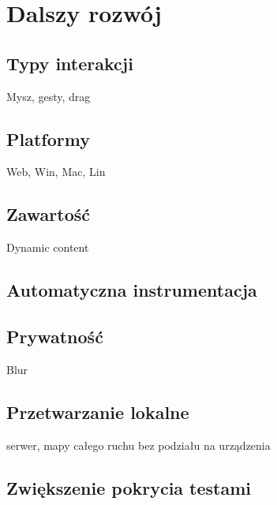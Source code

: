 \section{Dalszy rozwój}
\label{sec:future_work}

\subsection{Typy interakcji}
Mysz, gesty, drag

\subsection{Platformy}
Web, Win, Mac, Lin 

\subsection{Zawartość}
Dynamic content

\subsection{Automatyczna instrumentacja}
\label{sec:auto_instrumentation}

\subsection{Prywatność}
Blur

\subsection{Przetwarzanie lokalne}
serwer, mapy całego ruchu bez podziału na urządzenia

\subsection{Zwiększenie pokrycia testami}
\label{sec:future_coverage}
